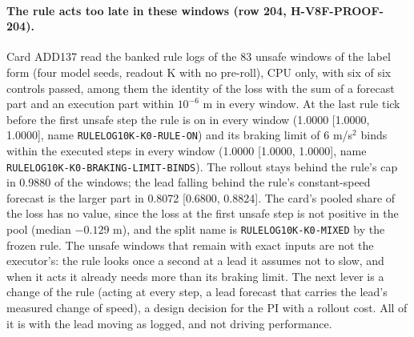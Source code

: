 \paragraph{The rule acts too late in these windows (row 204, H-V8F-PROOF-204).} Card ADD137 read the banked rule logs of the 83 unsafe windows of the label form (four model seeds, readout K with no pre-roll), CPU only, with six of six controls passed, among them the identity of the loss with the sum of a forecast part and an execution part within $10^{-6}$ m in every window. At the last rule tick before the first unsafe step the rule is on in every window (1.0000 [1.0000, 1.0000], name \texttt{RULELOG10K-K0-RULE-ON}) and its braking limit of 6 m/s$^2$ binds within the executed steps in every window (1.0000 [1.0000, 1.0000], name \texttt{RULELOG10K-K0-BRAKING-\allowbreak LIMIT-BINDS}). The rollout stays behind the rule's cap in 0.9880 of the windows; the lead falling behind the rule's constant-speed forecast is the larger part in 0.8072 [0.6800, 0.8824]. The card's pooled share of the loss has no value, since the loss at the first unsafe step is not positive in the pool (median $-0.129$ m), and the split name is \texttt{RULELOG10K-K0-MIXED} by the frozen rule. The unsafe windows that remain with exact inputs are not the executor's: the rule looks once a second at a lead it assumes not to slow, and when it acts it already needs more than its braking limit. The next lever is a change of the rule (acting at every step, a lead forecast that carries the lead's measured change of speed), a design decision for the PI with a rollout cost. All of it is  with the lead moving as logged, and not driving performance.
